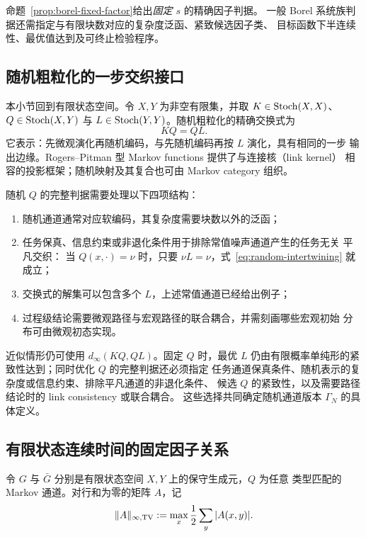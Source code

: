 命题~\ref{prop:borel-fixed-factor}给出\emph{固定 $s$} 的精确因子判据。
一般 Borel 系统族判据还需指定与有限块数对应的复杂度泛函、紧致候选因子类、
目标函数下半连续性、最优值达到及可终止检验程序。

\subsection{随机粗粒化的一步交织接口}

本小节回到有限状态空间。令 $X,Y$ 为非空有限集，并取 $K\in\operatorname{Stoch}(X,X)$、
$Q\in\operatorname{Stoch}(X,Y)$ 与 $L\in\operatorname{Stoch}(Y,Y)$。随机粗粒化的精确交换式为
\begin{equation}
KQ=QL.
\label{eq:random-intertwining}
\end{equation}
它表示：先微观演化再随机编码，与先随机编码再按 $L$ 演化，具有相同的一步
输出边缘。Rogers--Pitman 型 Markov functions 提供了与连接核（link kernel）
相容的投影框架\citep{RogersPitman1981}；随机映射及其复合也可由 Markov
category 组织\citep{Fritz2020}。

随机 $Q$ 的完整判据需要处理以下四项结构：
\begin{enumerate}
  \item 随机通道通常对应软编码，其复杂度需要块数以外的泛函；
  \item 任务保真、信息约束或非退化条件用于排除常值噪声通道产生的任务无关
  平凡交织：
  当 $Q(x,\cdot)=\nu$ 时，只要 $\nu L=\nu$，式~\eqref{eq:random-intertwining}
  就成立；
  \item 交换式的解集可以包含多个 $L$，上述常值通道已经给出例子；
  \item 过程级结论需要微观路径与宏观路径的联合耦合，并需刻画哪些宏观初始
  分布可由微观初态实现。
\end{enumerate}

近似情形仍可使用 $d_\infty(KQ,QL)$。固定 $Q$ 时，最优 $L$
仍由有限概率单纯形的紧致性达到；同时优化 $Q$ 的完整判据还必须指定
任务通道保真条件、随机表示的复杂度或信息约束、排除平凡通道的非退化条件、
候选 $Q$ 的紧致性，以及需要路径结论时的 link consistency 或联合耦合。
这些选择共同确定随机通道版本 $\Gamma_N$ 的具体定义。

\subsection{有限状态连续时间的固定因子关系}

令 $G$ 与 $\bar G$ 分别是有限状态空间 $X,Y$ 上的保守生成元，$Q$ 为任意
类型匹配的 Markov 通道。对行和为零的矩阵 $A$，记
\[
\|A\|_{\infty,\operatorname{TV}}
:=\max_x\frac12\sum_y|A(x,y)|.
\]


